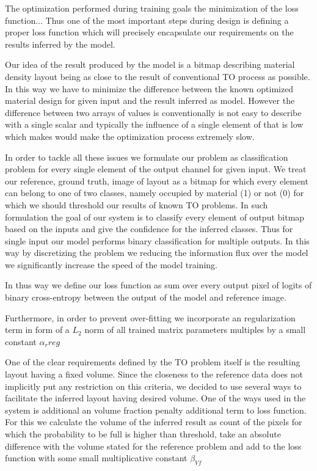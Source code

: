The optimization performed during training goals the minimization of the loss function...
Thus one of the most important steps during design is defining a proper loss function which will precisely encapsulate our requirements on the results inferred by the model.

Our idea of the result produced by the model is a bitmap describing material density layout being as close to the result of conventional TO process as possible.
In this way we have to minimize the difference between the known optimized material design for given input and the result inferred as model.
However the difference between two arrays of values is conventionally is not easy to describe with a single scalar and typically the influence of a single element of that is low which makes would make the optimization process extremely slow.

In order to tackle all these issues we formulate our problem as classification problem for every single element of the output channel for given input. 
We treat our reference, ground truth, image of layout as a bitmap for which every element can belong to one of two classes, namely occupied by material ({1})  or not ({0}) for which we should threshold our results of known TO problems.
In such formulation the goal of our system is to classify every element of output bitmap based on the inputs and give the confidence for the inferred classes.
Thus for single input our model performs binary classification for multiple outputs.
In this way by discretizing the problem we  reducing the information flux over the model we significantly increase the speed of the model training.

In thus way we define our loss function as sum over every output pixel of logits of binary cross-entropy between the output of the model and reference image.


Furthermore, in order to prevent over-fitting we incorporate an regularization term in form of a $L_{2}$ norm of all trained matrix parameters multiples by a small constant $\alpha_r{reg}$

One of the clear requirements defined by the TO problem itself is the resulting layout having a fixed volume. 
Since the closeness to the reference data does not implicitly put any restriction on this criteria, we decided to use several ways to facilitate the inferred layout having desired volume.
One of the ways used in the system is additional an volume fraction penalty additional term to loss function.
For this we calculate the volume of the inferred result as count of the pixels for which the probability to be full is higher than threshold, take an absolute difference with the volume stated for the reference problem and add to the loss function with some small multiplicative constant $\beta_{Vf}$
